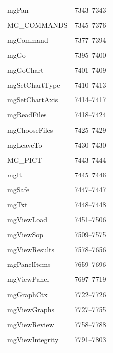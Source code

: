 {\begin{longtable}{@{}p{11cm}r@{}}
mgPan & 7343--7343 \\\\\hline
MG\_COMMANDS & 7345--7376 \\\\\hline
mgCommand & 7377--7394 \\\\\hline
mgGo & 7395--7400 \\\\\hline
mgGoChart & 7401--7409 \\\\\hline
mgSetChartType & 7410--7413 \\\\\hline
mgSetChartAxis & 7414--7417 \\\\\hline
mgReadFiles & 7418--7424 \\\\\hline
mgChooseFiles & 7425--7429 \\\\\hline
mgLeaveTo & 7430--7430 \\\\\hline
MG\_PICT & 7443--7444 \\\\\hline
mgIt & 7445--7446 \\\\\hline
mgSafe & 7447--7447 \\\\\hline
mgTxt & 7448--7448 \\\\\hline
mgViewLoad & 7451--7506 \\\\\hline
mgViewSop & 7509--7575 \\\\\hline
mgViewResults & 7578--7656 \\\\\hline
mgPanelItems & 7659--7696 \\\\\hline
mgViewPanel & 7697--7719 \\\\\hline
mgGraphCtx & 7722--7726 \\\\\hline
mgViewGraphs & 7727--7755 \\\\\hline
mgViewReview & 7758--7788 \\\\\hline
mgViewIntegrity & 7791--7803 \\\\\hline

\end{longtable}}
